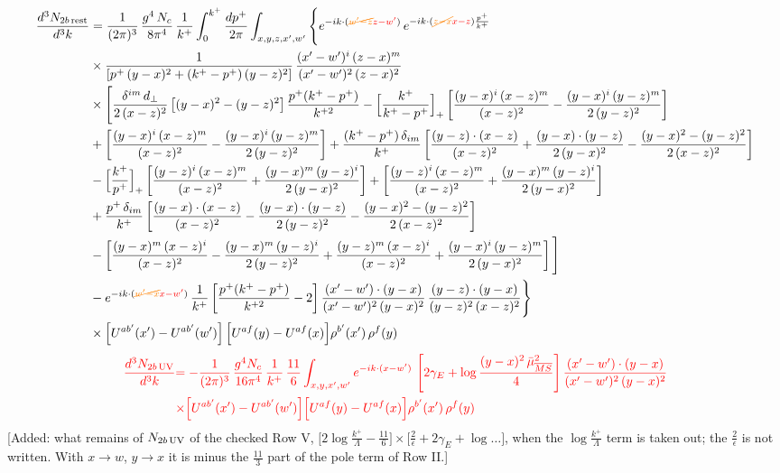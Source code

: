 \documentclass[9pt]{article}
\numberwithin{equation}{section}
\begin{document}
\begin{align}
\frac{d^{3}N_{2b\,\rm rest}}{d^{3}k} & =\frac{1}{(2\pi)^{3}}\,\frac{g^{4}\,N_{c}}{8\pi^{4}}\,\frac{1}{k^{+}}\int_{0}^{k^{+}}\frac{dp^{+}}{2\pi}\int_{x,y,z,x',w'}\Bigg\{e^{-ik\cdot({\color{orange}\cancel{w'-z}}{\color{red}z-w'})}\,e^{-ik\cdot({\color{orange}\cancel{z-x}}{\color{red}x-z})\frac{p^{+}}{k^{+}}}\notag \\ & \times\frac{1}{\left[p^{+}\,(y-x)^{2}+(k^{+}-p^{+})\,(y-z)^{2}\right]}\,\frac{(x'-w')^{i}\,(z-x)^{m}}{(x'-w')^{2}\,(z-x)^{2}}\notag\\
&\times\Bigg[\frac{\delta^{im}\,d_{\perp}}{2\,(x-z)^{2}}\left[(y-x)^{2}-(y-z)^{2}\right]\frac{p^{+}(k^{+}-p^{+})}{k^{+2}}
-\Big[\frac{k^{+}}{k^{+}-p^{+}}\Big]_{+}\left[\frac{(y-x)^{i}\,(x-z)^{m}}{(x-z)^{2}}-\frac{(y-x)^{i}\,(y-z)^{m}}{2\,(y-z)^{2}}\right]\notag\\
&+\left[\frac{(y-x)^{i}\,(x-z)^{m}}{(x-z)^{2}}-\frac{(y-x)^{i}\,(y-z)^{m}}{2\,(y-z)^{2}}\right]
+\frac{(k^{+}-p^{+})\,\delta_{im}}{k^{+}}\left[\frac{(y-z)\cdot(x-z)}{(x-z)^{2}}+\frac{(y-x)\cdot(y-z)}{2\,(y-x)^{2}}-\frac{(y-x)^{2}-(y-z)^{2}}{2\,(x-z)^{2}}\right]\notag\\
&-\Big[\frac{k^{+}}{p^{+}}\Big]_{+}\left[\frac{(y-z)^{i}\,(x-z)^{m}}{(x-z)^{2}}+\frac{(y-x)^{m}\,(y-z)^{i}}{2\,(y-x)^{2}}\right]+\left[\frac{(y-z)^{i}\,(x-z)^{m}}{(x-z)^{2}}+\frac{(y-x)^{m}\,(y-z)^{i}}{2\,(y-x)^{2}}\right]\notag\\
&+\frac{p^{+}\,\delta_{im}}{k^{+}}\left[\frac{(y-x)\cdot(x-z)}{(x-z)^{2}}-\frac{(y-x)\cdot(y-z)}{2\,(y-z)^{2}}-\frac{(y-x)^{2}-(y-z)^{2}}{2\,(x-z)^{2}}\right]\notag\\
&-\left[\frac{(y-x)^{m}\,(x-z)^{i}}{(x-z)^{2}}-\frac{(y-x)^{m}\,(y-z)^{i}}{2\,(y-z)^{2}}+\frac{(y-z)^{m}\,(x-z)^{i}}{(x-z)^{2}}+\frac{(y-x)^{i}\,(y-z)^{m}}{2\,(y-x)^{2}}\right]\Bigg]\notag\\
&-e^{-ik\cdot({\color{orange}\cancel{w'-x}}{\color{red}x-w'})}\,\frac{1}{k^{+}}\left[\frac{p^{+}(k^{+}-p^{+})}{k^{+2}}-2\right]\frac{(x'-w')\cdot(y-x)}{(x'-w')^{2}\,(y-x)^{2}}\,\frac{(y-z)\cdot(y-x)}{(y-z)^{2}\,(x-z)^{2}}\Bigg\}\notag\\
&\times\Big[U^{ab'}(x')-U^{ab'}(w')\Big]\,\Big[U^{af}(y)-U^{af}(x)\Big]\rho^{b'}(x')\,\rho^{f}(y)
\end{align} \begin{align} {\color{red}\frac{d^{3}N_{2b\,\rm UV}}{d^{3}k}} & {\color{red}=-\frac{1}{(2\pi)^{3}}\,\frac{g^{4}N_{c}}{16\pi^{4}}\,\frac{1}{k^{+}}\,\frac{11}{6}\int_{x,y,x',w'}e^{-ik\cdot(x-w')}\,\left[2\gamma_{E}+\log\frac{(y-x)^{2}\,\bar\mu^{2}_{\overline{MS}}}{4}\right]\frac{(x'-w')\cdot(y-x)}{(x'-w')^{2}\,(y-x)^{2}}}\notag \\ & {\color{red}\times\Big[U^{ab'}(x')-U^{ab'}(w')\Big]\Big[U^{af}(y)-U^{af}(x)\Big]\rho^{b'}(x')\,\rho^{f}(y)} \end{align} {\color{red}[Added: what remains of $N_{2b\,\rm UV}$ of the checked Row V, $\big[2\log\frac{k^{+}}{\Lambda}-\frac{11}{6}\big]\times$$\big[\frac{2}{\epsilon}+2\gamma_{E}+\log\dots\big]$, when the $\log\frac{k^{+}}{\Lambda}$ term is taken out; the $\frac{2}{\epsilon}$ is not written. With $x\to w$, $y\to x$ it is minus the $\frac{11}{3}$ part of the pole term of Row II.]}\par\noindent
\end{document}
